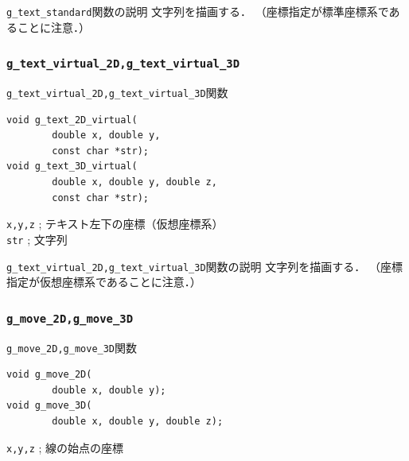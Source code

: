 \documentclass[platex,a4paper,12pt]{jsarticle}%
\begin{document}
\begin{itembox}[l]{\texttt{g\_text\_standard}関数の説明}
文字列を描画する．
（座標指定が標準座標系であることに注意．）
\end{itembox}


\subsubsection{\texttt{g\_text\_virtual\_2D,g\_text\_virtual\_3D}}

\begin{itembox}[l]{\texttt{g\_text\_virtual\_2D,g\_text\_virtual\_3D}関数}
\begin{verbatim}
void g_text_2D_virtual(
        double x, double y,
        const char *str);
void g_text_3D_virtual(
        double x, double y, double z,
        const char *str);      
\end{verbatim}
\verb|x,y,z| ; テキスト左下の座標（仮想座標系）\\
\verb|str| ; 文字列
\end{itembox}

\begin{itembox}[l]{\texttt{g\_text\_virtual\_2D,g\_text\_virtual\_3D}関数の説明}
文字列を描画する．
（座標指定が仮想座標系であることに注意．）
\end{itembox}

\begin{figure}[htb]
\end{figure}




\clearpage
\subsubsection{\texttt{g\_move\_2D,g\_move\_3D}}

\begin{itembox}[l]{\texttt{g\_move\_2D,g\_move\_3D}関数}
\begin{verbatim}
void g_move_2D(
        double x, double y);
void g_move_3D(
        double x, double y, double z);     
\end{verbatim}
\verb|x,y,z| ; 線の始点の座標\\
\end{itembox}
\end{document}
